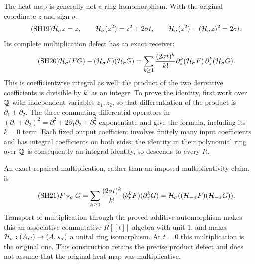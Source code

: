 The heat map is generally not a ring homomorphism. With the
original coordinate $z$ and sign $\sigma$,
\begin{equation}\tag{SH19}\label{sh:productdefectexample}
 \mathcal H_\sigma z=z,\qquad
 \mathcal H_\sigma(z^2)=z^2+2\sigma t,\qquad
 \mathcal H_\sigma(z^2)-(\mathcal H_\sigma z)^2=2\sigma t.
\end{equation}
Its complete multiplication defect has an exact receiver:
\begin{equation}\tag{SH20}\label{sh:productdefect}
 \mathcal H_\sigma(FG)-(\mathcal H_\sigma F)(\mathcal H_\sigma G)
 =\sum_{k\ge1}\frac{(2\sigma t)^k}{k!}
       \partial_z^k(\mathcal H_\sigma F)\,
       \partial_z^k(\mathcal H_\sigma G).
\end{equation}
This is coefficientwise integral as well: the product of the two
derivative coefficients is divisible by $k!$ as an integer.
To prove the identity, first work over $\mathbb Q$ with independent
variables $z_1,z_2$, so that differentiation of the product is
$\partial_1+\partial_2$. The three commuting differential
operators in
$(\partial_1+\partial_2)^2=\partial_1^2+
2\partial_1\partial_2+\partial_2^2$ exponentiate and give the
formula, including its $k=0$ term. Each fixed output coefficient
involves finitely many input coefficients and has integral
coefficients on both sides; the identity in their polynomial
ring over $\mathbb Q$ is consequently an integral identity, so descends
to every $R$.

An exact repaired multiplication, rather than an imposed
multiplicativity claim, is
\begin{equation}\tag{SH21}\label{sh:star}
 F\star_\sigma G
 =\sum_{k\ge0}\frac{(2\sigma t)^k}{k!}
                       (\partial_z^kF)(\partial_z^kG)
 =\mathcal H_\sigma((\mathcal H_{-\sigma}F)(\mathcal H_{-\sigma}G)).
\end{equation}
Transport of multiplication through the proved additive
automorphism makes this an associative commutative
$R[[t]]$-algebra with unit $1$, and makes
$\mathcal H_\sigma:(A,\cdot)\to(A,\star_\sigma)$ a unital
ring isomorphism. At $t=0$ this multiplication is the original
one. This construction retains the precise product defect and
does not assume that the original heat map was multiplicative.

